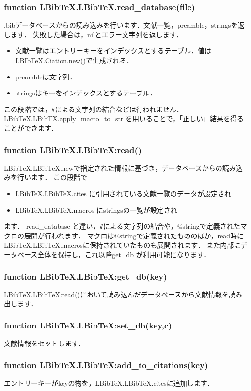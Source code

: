 \documentclass[dvipdfmx,a4paper]{jsarticle}
\begin{document}
\subsubsection{function LBibTeX.LBibTeX.read\_database(file)}
.bibデータベースからの読み込みを行います．文献一覧，preamble，stringsを返します．
失敗した場合は，nilとエラー文字列を返します．
\begin{itemize}
\item 文献一覧はエントリーキーをインデックスとするテーブル．値はLBIbTeX.Ciation.new()で生成される．
\item preambleは文字列．
\item stringsはキーをインデックスとするテーブル．
\end{itemize}
この段階では，\verb|#|による文字列の結合などは行われません．
LBibTeX.LBibTX.apply\_macro\_to\_str を用いることで，「正しい」結果を得ることができます．

\subsubsection{function LBibTeX.LBibTeX:read()}
LBibTeX.LBibTeX.newで指定された情報に基づき，データベースからの読み込みを行います．
この段階で
\begin{itemize}
\item LBibTeX.LBibTeX.cites に引用されている文献一覧のデータが設定され
\item LBibTeX.LBibTeX.macros にstringsの一覧が設定され
\end{itemize}
ます．
read\_database と違い，\verb|#|による文字列の結合や，@stringで定義されたマクロの展開が行われます．
マクロは@stringで定義されたもののほか，read時にLBibTeX.LBibTeX.macrosに保持されていたものも展開されます．
また内部にデータベース全体を保持し，これ以降get\_db が利用可能になります．


\subsubsection{function LBibTeX.LBibTeX:get\_db(key)}
LBibTeX.LBibTeX:read()において読み込んだデータベースから文献情報を読み出します．

\subsubsection{function LBibTeX.LBibTeX:set\_db(key,c)}
文献情報をセットします．

\subsubsection{function LBibTeX.LBibTeX:add\_to\_citations(key)}
エントリーキーがkeyの物を，LBibTeX.LBibTeX.citesに追加します．
\end{document}
